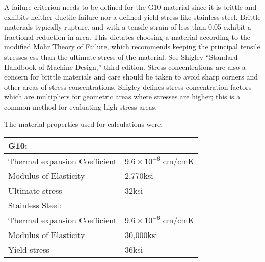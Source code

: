 
A failure criterion needs to be defined for the G10 material since it is brittle and exhibits neither ductile failure nor a defined yield stress like stainless steel.  Brittle materials typically rupture, and with a tensile strain of less than 0.05 exhibit a fractional reduction in area.  This dictates choosing a material according to 
the modified Mohr Theory of Failure, which recommends keeping the principal tensile stresses ess than the ultimate stress of the material.  See Shigley ``Standard Handbook of Machine Design,'' third edition.   Stress concentrations are also a concern for brittle materials and care should be taken to avoid sharp corners and other areas of stress concentrations.  Shigley defines stress concentration factors which are multipliers for geometric areas where stresses are higher; this is a common method for evaluating high stress areas.  


The material properties used for calculations were:

\begin{tabular}{l l}
G10: 	& \\
\hline
Thermal expansion Coefficient	&	$9.6 \times 10^{-6}$ cm/cmK	\\
Modulus of Elasticity			&	2,770ksi				\\
\vspace{0.5em}Ultimate stress				&	32ksi				\\
Stainless Steel: & \\
\hline
Thermal expansion Coefficient	&	$9.6 \times 10^{-6}$ cm/cmK	\\
Modulus of Elasticity			&	30,000ksi				\\
Yield stress					&	36ksi				\\
\end{tabular}

